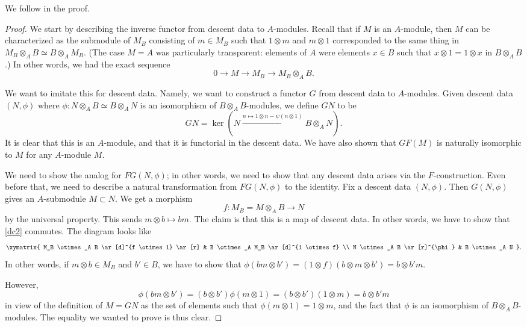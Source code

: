 We follow \cite{Vi08} in the proof.
\begin{proof} 
We start by describing the inverse functor from descent data to $A$-modules.
Recall that if $M$ is an $A$-module, then $M$ can be characterized as the
submodule of $M_B$ consisting of $m \in M_B$ such that $1
\otimes m$ and $m \otimes 1$ corresponded to the same thing in $M_B \otimes_A B
\simeq B \otimes_A M_B$.
(The case $M = A$ was particularly transparent: elements of $A$ were elements
$x \in B$ such that $x \otimes 1 = 1 \otimes x$ in $B \otimes_A B$.)
In other words, we had the exact sequence
\[ 0 \to M \to M_B \to M_B \otimes_A B . \]

We want to imitate this for descent data.
Namely, we want to construct a functor $G$ from descent data to $A$-modules. 
Given descent data $(N, \phi)$ where $\phi: N \otimes_A B \simeq B \otimes_A
N$ is an isomorphism of $B \otimes_A B$-modules, we define $GN$ to be 
\[ GN = \ker ( N \stackrel{n \mapsto 1 \otimes n - \psi(n \otimes 1) }{\to} B
\otimes_A N).  \]
It is clear that this is an $A$-module, and that it is functorial in the
descent data.
We have also shown that $GF (M)$ is naturally isomorphic to $M$ for any
$A$-module $M$. 

We need to show the analog for $FG(N, \phi)$; in other words, we need to show
that any descent data arises via the $F$-construction. Even before that, we
need to describe a natural transformation from $FG(N, \phi)$ to the identity.
Fix a  descent data $(N, \phi)$.
Then $G(N, \phi)$ gives an $A$-submodule $M \subset N$.
We get a morphism 
\[ f:  M_B = M \otimes_A B \to N  \]
by the universal property. This sends $m \otimes b \mapsto bm$.
The claim is that 
this is a map of descent data.
In other words, we have to show that \eqref{dc2} commutes.
The diagram looks like
\[ \xymatrix{
M_B \otimes_A B \ar[d]^{f \otimes 1} \ar[r] &  B \otimes_A M_B \ar[d]^{1
\otimes f}  \\
N \otimes_A B \ar[r]^{\phi} &  B \otimes_A N
}.\]
In other words, if $m\otimes b \in M_B$ and $b' \in B$, we have to show that
$\phi(  bm  \otimes b' ) =  (1 \otimes f)( b \otimes m \otimes b') = b \otimes
b' m$.

However, 
\[ \phi(bm \otimes b') = (b \otimes b') \phi(m \otimes 1) = (b \otimes b')(1
\otimes m) = b \otimes b'm  \]
in view of the definition of $M = GN$ as the set of elements such that $\phi(m
\otimes 1) = 1 \otimes m$, and the fact that $\phi$ is an isomorphism of $B
\otimes_A B$-modules. The equality we wanted to prove is thus clear.


\end{proof}

